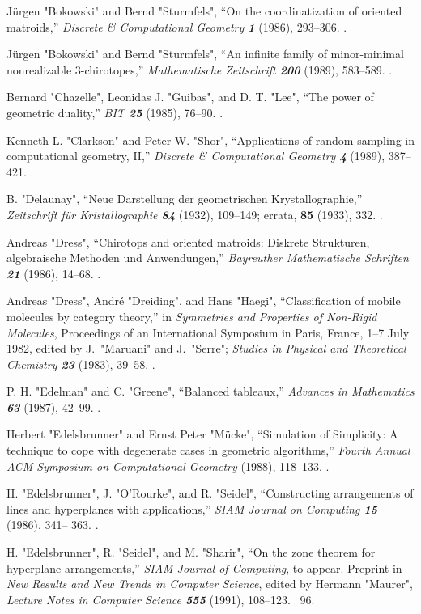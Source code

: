 \bib[9]
J\"urgen "Bokowski" and Bernd "Sturmfels", ``On the coordinatization of
oriented matroids,'' {\sl Discrete \& Computational Geometry\/ \bf 1}
(1986), 293--306.
.

\bib[10]
J\"urgen "Bokowski" and Bernd "Sturmfels", ``An infinite family of
minor-minimal non\-realizable 3-chirotopes,'' {\sl Mathematische
Zeitschrift\/ \bf 200} (1989), 583--589.
.

\bib[11]
Bernard "Chazelle", Leonidas J. "Guibas", and D. T. "Lee", ``The power of
geometric duality,'' {\sl BIT\/ \bf 25} (1985), 76--90.
.

\bib[12]
Kenneth L. "Clarkson" and Peter W. "Shor", ``Applications of random
sampling in computational geometry, II,'' {\sl Discrete \&
Computational Geometry\/ \bf 4} (1989), 387--421.
.

\bib[13]
B. "Delaunay", ``Neue Darstellung der geometrischen Krystallographie,''
{\sl Zeit\-schrift f\"ur Kristallographie\/ \bf 84} (1932), 109--149;
errata, {\bf 85}  (1933), 332.
.

\bib[14]
Andreas "Dress", ``Chirotops and oriented matroids: Diskrete Strukturen,
algebraische Methoden und Anwendungen,'' {\sl Bayreuther Mathematische
Schriften\/ \bf 21} (1986), 14--68.
.

\bib[15]
Andreas "Dress", Andr\'e "Dreiding", and Hans "Haegi", ``Classification of
mobile molecules by category theory,'' in {\sl Symmetries and
Properties of Non-Rigid Molecules}, Proceedings of an International
Symposium in Paris, France, 1--7 July 1982, edited by J.~"Maruani" and
J.~"Serre"; {\sl Studies in Physical and Theoretical Chemistry\/ \bf 23}
(1983), 39--58.
.

\bib[16]
P. H. "Edelman" and C. "Greene", ``Balanced tableaux,'' {\sl Advances in
Mathematics\/ \bf 63} (1987), 42--99.
.

\bib[17]
Herbert "Edelsbrunner" and Ernst Peter "M\"ucke", ``Simulation of Simplicity:
A technique to cope with degenerate cases in geometric algorithms,''
{\sl Fourth Annual ACM Symposium on Computational Geometry} (1988),
118--133. 
.

\bib[18]
H. "Edelsbrunner", J. "O'Rourke", and R. "Seidel", ``Constructing
arrangements of lines and hyperplanes with applications,'' {\sl SIAM
Journal on Computing\/ \bf 15} (1986), 341-- 363.
.

\bib[19]
H. "Edelsbrunner", R. "Seidel", and M. "Sharir", ``On the zone theorem
for hyperplane arrangements,'' {\sl SIAM Journal of Computing\/}, to
appear. Preprint in
{\sl New Results and New Trends in Computer Science}, edited
by Hermann "Maurer", {\sl Lecture Notes in Computer Science\/ \bf555}
(1991), 108--123.
\>~96.

